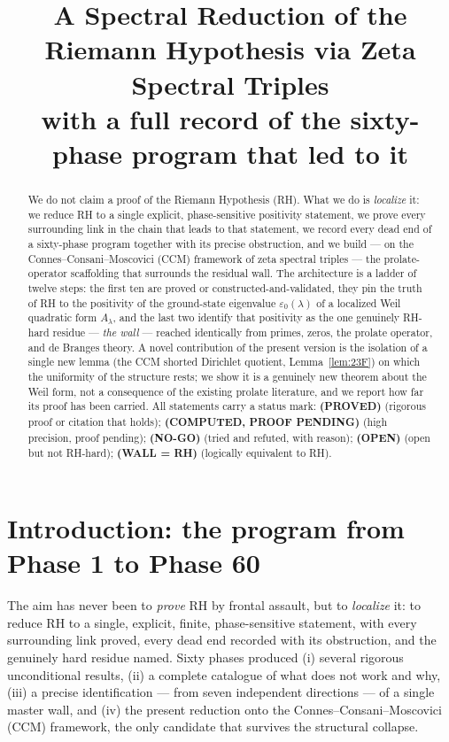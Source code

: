\documentclass[11pt]{amsart}
\title[A Spectral Reduction of RH via Zeta Spectral Triples]{A Spectral Reduction of the
Riemann Hypothesis via Zeta Spectral Triples\\[2pt]
\large with a full record of the sixty-phase program that led to it}
\date{}
\theoremstyle{definition}
\theoremstyle{remark}
\newcommand{\ve}{\varepsilon}
\newcommand{\PROVED}{\textbf{(PROVED)}}
\newcommand{\COMP}{\textbf{(COMPUTED, PROOF PENDING)}}
\newcommand{\NOGO}{\textbf{(NO-GO)}}
\newcommand{\OPEN}{\textbf{(OPEN)}}
\newcommand{\WALL}{\textbf{(WALL = RH)}}
\begin{document}
\maketitle

\begin{abstract}
\noindent We do not claim a proof of the Riemann Hypothesis (RH). What we do is \emph{localize}
it: we reduce RH to a single explicit, phase-sensitive positivity statement, we prove every
surrounding link in the chain that leads to that statement, we record every dead end of a
sixty-phase program together with its precise obstruction, and we build --- on the
Connes--Consani--Moscovici (CCM) framework of zeta spectral triples --- the prolate-operator
scaffolding that surrounds the residual wall. The architecture is a ladder of twelve steps:
the first ten are proved or constructed-and-validated, they pin the truth of RH to the
positivity of the ground-state eigenvalue $\ve_0(\lambda)$ of a localized Weil quadratic form
$A_\lambda$, and the last two identify that positivity as the one genuinely RH-hard residue ---
\emph{the wall} --- reached identically from primes, zeros, the prolate operator, and de
Branges theory. A novel contribution of the present version is the isolation of a single new
lemma (the CCM shorted Dirichlet quotient, Lemma~\ref{lem:23F}) on which the uniformity of the
structure rests; we show it is a genuinely new theorem about the Weil form, not a consequence
of the existing prolate literature, and we report how far its proof has been carried. All
statements carry a status mark: \PROVED{} (rigorous proof or citation that holds); \COMP{}
(high precision, proof pending); \NOGO{} (tried and refuted, with reason); \OPEN{} (open but
not RH-hard); \WALL{} (logically equivalent to RH).
\end{abstract}

\tableofcontents
\newpage

\section{Introduction: the program from Phase 1 to Phase 60}

The aim has never been to \emph{prove} RH by frontal assault, but to \emph{localize} it: to
reduce RH to a single, explicit, finite, phase-sensitive statement, with every surrounding link
proved, every dead end recorded with its obstruction, and the genuinely hard residue named.
Sixty phases produced (i) several rigorous unconditional results, (ii) a complete catalogue of
what does not work and why, (iii) a precise identification --- from seven independent
directions --- of a single master wall, and (iv) the present reduction onto the
Connes--Consani--Moscovici (CCM) framework, the only candidate that survives the structural
collapse.
\end{document}
